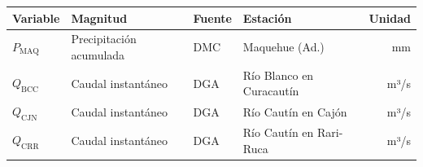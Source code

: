 \documentclass[varwidth=false]{standalone}
\begin{document}
\begin{tabular}{|l|l|l|l|r|}

\hline
\textbf{Variable} & \textbf{Magnitud} & \textbf{Fuente} & \textbf{Estación}	& \textbf{Unidad}\\
\hline
$P_\mathrm{MAQ}$ & Precipitación acumulada & DMC & Maquehue (Ad.) & mm\\
\hline
$Q_\mathrm{BCC}$ & Caudal instantáneo & DGA & Río Blanco en Curacautín & m³/s\\
\hline
$Q_\mathrm{CJN}$ & Caudal instantáneo & DGA & Río Cautín en Cajón & m³/s\\
\hline
$Q_\mathrm{CRR}$ & Caudal instantáneo & DGA & Río Cautín en Rari-Ruca & m³/s\\
\hline


\end{tabular}
\end{document}
